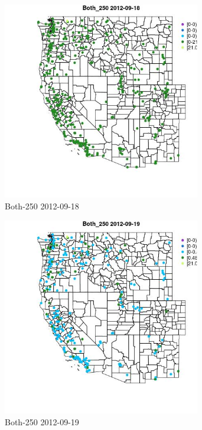 \begin{figure} 
\centering  
\includegraphics[width=0.77\textwidth]{Code_Outputs/ML_input_report_ML_input_PM25_Step5_part_d_de_duplicated_aves_ML_input_MapObsBoth_2502012-09-18.jpg} 
\caption{\label{fig:ML_input_report_ML_input_PM25_Step5_part_d_de_duplicated_aves_ML_inputMapObsBoth_2502012-09-18}Both-250 2012-09-18} 
\end{figure} 
 

\begin{figure} 
\centering  
\includegraphics[width=0.77\textwidth]{Code_Outputs/ML_input_report_ML_input_PM25_Step5_part_d_de_duplicated_aves_ML_input_MapObsBoth_2502012-09-19.jpg} 
\caption{\label{fig:ML_input_report_ML_input_PM25_Step5_part_d_de_duplicated_aves_ML_inputMapObsBoth_2502012-09-19}Both-250 2012-09-19} 
\end{figure} 
 


